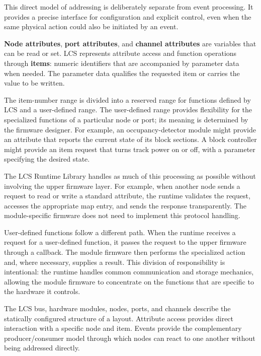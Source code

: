 This direct model of addressing is deliberately separate from event processing. It provides a precise interface for configuration and explicit control, even when the same physical action could also be initiated by an event.


\textbf{Node attributes}, \textbf{port attributes}, and \textbf{channel attributes} are variables that can be read or set. LCS represents attribute access and function operations through \textbf{items}: numeric identifiers that are accompanied by parameter data when needed. The parameter data qualifies the requested item or carries the value to be written.

The item-number range is divided into a reserved range for functions defined by LCS and a user-defined range. The user-defined range provides flexibility for the specialized functions of a particular node or port; its meaning is determined by the firmware designer. For example, an occupancy-detector module might provide an attribute that reports the current state of its block sections. A block controller might provide an item request that turns track power on or off, with a parameter specifying the desired state.

The LCS Runtime Library handles as much of this processing as possible without involving the upper firmware layer. For example, when another node sends a request to read or write a standard attribute, the runtime validates the request, accesses the appropriate map entry, and sends the response transparently. The module-specific firmware does not need to implement this protocol handling.

User-defined functions follow a different path. When the runtime receives a request for a user-defined function, it passes the request to the upper firmware through a callback. The module firmware then performs the specialized action and, where necessary, supplies a result. This division of responsibility is intentional: the runtime handles common communication and storage mechanics, allowing the module firmware to concentrate on the functions that are specific to the hardware it controls.


The LCS bus, hardware modules, nodes, ports, and channels describe the statically configured structure of a layout. Attribute access provides direct interaction with a specific node and item. Events provide the complementary producer/consumer model through which nodes can react to one another without being addressed directly.

